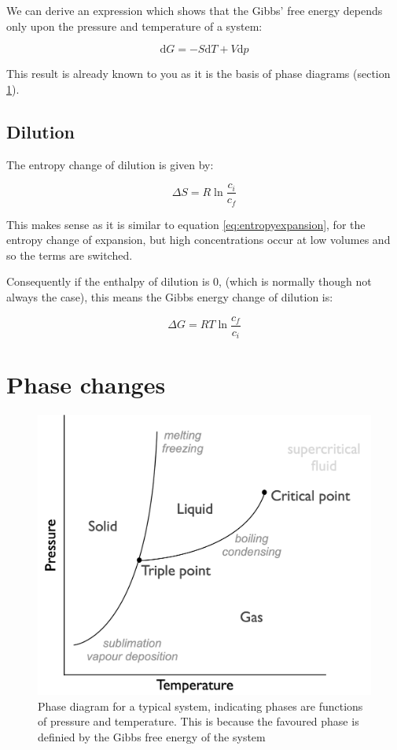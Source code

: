 \documentclass[
]{book}
\begin{document}
We can derive an expression which shows that the Gibbs' free energy depends only upon the pressure and temperature of a system:

\begin{equation*}
\textrm{d}G= -S\textrm{d}T + V\textrm{d}p
\end{equation*}

This result is already known to you as it is the basis of phase diagrams (section \ref{sec:phasegibbs}).

\hypertarget{dilution}{%
\subsection{Dilution}\label{dilution}}

The entropy change of dilution is given by:

\begin{equation*}
\Delta S = R \ln \frac{c_i}{c_f}
\end{equation*}

This makes sense as it is similar to equation \eqref{eq:entropyexpansion}, for the entropy change of expansion, but high concentrations occur at low volumes and so the terms are switched.

Consequently if the enthalpy of dilution is 0, (which is normally though not always the case), this means the Gibbs energy change of dilution is:

\begin{equation}
\Delta G = RT \ln \frac{c_f}{c_i}
\label{eq:Gibbsdilution}
\end{equation}

\hypertarget{sec:phasegibbs}{%
\section{Phase changes}\label{sec:phasegibbs}}

\begin{figure}

{\centering \includegraphics[width=0.8\linewidth]{images/phasediagram} 

}

\caption{Phase diagram for a typical system, indicating phases are functions of pressure and temperature. This is because the favoured phase is definied by the Gibbs free energy of the system}\label{fig:phasediagram}
\end{figure}
\end{document}
